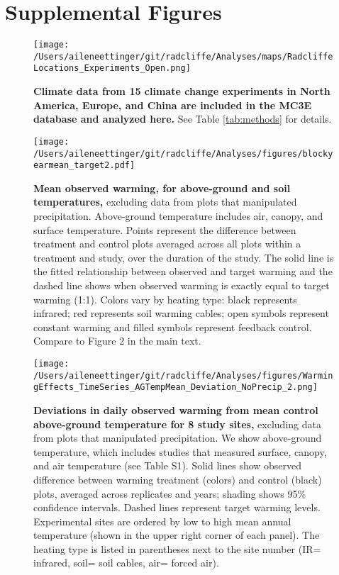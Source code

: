 \documentclass{article}
\begin{document}
\section* {Supplemental Figures}
\begin{figure}[p]
\centering
\texttt{[image: /Users/aileneettinger/git/radcliffe/Analyses/maps/RadcliffeLocations\_Experiments\_Open.png]} 
\caption{\textbf{Climate data from 15 climate change experiments in North America, Europe, and China are included in the MC3E database and analyzed here.} See Table \ref{tab:methods} for details.} 
\label{fig:map}
\end{figure}
\clearpage
\begin{figure}[h]
\centering
\texttt{[image: /Users/aileneettinger/git/radcliffe/Analyses/figures/blockyearmean\_target2.pdf]}
\caption{\textbf{Mean observed warming, for above-ground and soil temperatures,} excluding data from plots that manipulated precipitation. Above-ground temperature includes air, canopy, and surface temperature. Points represent the difference between treatment and control plots averaged across all plots within a treatment and study, over the duration of the study. The solid line is the fitted relationship between observed and target warming and the dashed line shows when observed warming is exactly equal to target warming (1:1). Colors vary by heating type: black represents infrared; red represents soil warming cables; open symbols represent constant warming and filled symbols represent feedback control. Compare to Figure 2 in the main text.}
 \label{fig:blockyear}
 \end{figure}
\clearpage
\begin{figure}[h]
\centering
\texttt{[image: /Users/aileneettinger/git/radcliffe/Analyses/figures/WarmingEffects\_TimeSeries\_AGTempMean\_Deviation\_NoPrecip\_2.png]}
\caption{\textbf{Deviations in daily observed warming from mean control above-ground temperature for 8 study sites,} excluding data from plots that manipulated precipitation. We show above-ground temperature, which includes studies that measured surface, canopy, and air temperature (see Table S1). Solid lines show observed difference between warming treatment (colors) and control (black) plots, averaged across replicates and years; shading shows 95\% confidence intervals. Dashed lines represent target warming levels. Experimental sites are ordered by low to high mean annual temperature (shown in the upper right corner of each panel). The heating type is listed in parentheses next to the site number (IR= infrared, soil= soil cables, air= forced air).} 
\label{fig:effwarmagtemp}
\end{figure}

% 
\end{document}

